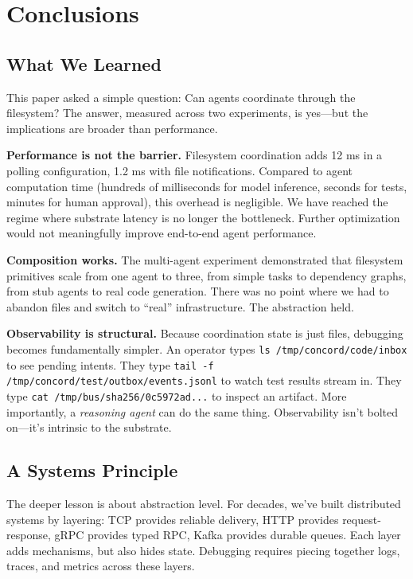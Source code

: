 \documentclass[11pt]{article}
\begin{document}
\section{Conclusions}

\subsection{What We Learned}

This paper asked a simple question: Can agents coordinate through the filesystem? The answer, measured across two experiments, is yes---but the implications are broader than performance.

\textbf{Performance is not the barrier.} Filesystem coordination adds 12 ms in a polling configuration, 1.2 ms with file notifications. Compared to agent computation time (hundreds of milliseconds for model inference, seconds for tests, minutes for human approval), this overhead is negligible. We have reached the regime where substrate latency is no longer the bottleneck. Further optimization would not meaningfully improve end-to-end agent performance.

\textbf{Composition works.} The multi-agent experiment demonstrated that filesystem primitives scale from one agent to three, from simple tasks to dependency graphs, from stub agents to real code generation. There was no point where we had to abandon files and switch to ``real'' infrastructure. The abstraction held.

\textbf{Observability is structural.} Because coordination state is just files, debugging becomes fundamentally simpler. An operator types \texttt{ls /tmp/concord/code/inbox} to see pending intents. They type \texttt{tail -f /tmp/concord/test/outbox/events.jsonl} to watch test results stream in. They type \texttt{cat /tmp/bus/sha256/0c5972ad...} to inspect an artifact. More importantly, a \emph{reasoning agent} can do the same thing. Observability isn't bolted on---it's intrinsic to the substrate.

\subsection{A Systems Principle}

The deeper lesson is about abstraction level. For decades, we've built distributed systems by layering: TCP provides reliable delivery, HTTP provides request-response, gRPC provides typed RPC, Kafka provides durable queues. Each layer adds mechanisms, but also hides state. Debugging requires piecing together logs, traces, and metrics across these layers.
\end{document}

